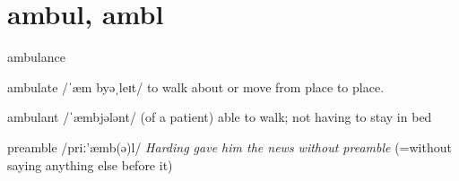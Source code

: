 \chapter{ambul, ambl}
\begin{word}{ambulance}
\end{word}

\begin{word}{ambulate /ˈæm byəˌleɪt/} to walk about or move from place to place.
\end{word}

\begin{word}{ambulant /ˈæmbjələnt/} (of a patient) able to walk; not having to stay in bed
\end{word}

\begin{word}{preamble /priː'æmb(ə)l/}
\textit{Harding gave him the news without preamble} (=without saying anything else before it)
\end{word}